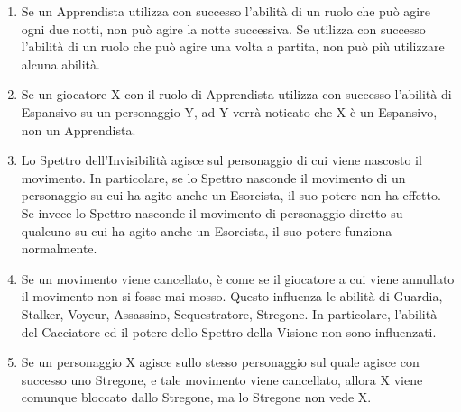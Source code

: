 \documentclass[a4paper,10pt]{article}
\begin{document}
\begin{enumerate}
	\item Se un Apprendista utilizza con successo l'abilità di un ruolo che può agire ogni due notti, non può agire la notte successiva. Se utilizza con successo l'abilità di un ruolo che può agire una volta a partita, non può più utilizzare alcuna abilità.

	\item Se un giocatore X con il ruolo di Apprendista utilizza con successo l'abilità di Espansivo su un personaggio Y, ad Y verrà noticato che X è un Espansivo, non un Apprendista.

	\item Lo Spettro dell'Invisibilità agisce sul personaggio di cui viene nascosto il movimento. In particolare, se lo Spettro nasconde il movimento di un personaggio su cui ha agito anche un Esorcista, il suo potere non ha effetto. Se invece lo Spettro nasconde il movimento di personaggio diretto su qualcuno su cui ha agito anche un Esorcista, il suo potere funziona normalmente.



	\item Se un movimento viene cancellato, è come se il giocatore a cui viene annullato il movimento non si fosse mai mosso. Questo influenza le abilità di Guardia, Stalker, Voyeur, Assassino, Sequestratore, Stregone. In particolare, l'abilità del Cacciatore ed il potere dello Spettro della Visione non sono influenzati.

	\item Se un personaggio X agisce sullo stesso personaggio sul quale agisce con successo uno Stregone, e tale movimento viene cancellato, allora X viene comunque bloccato dallo Stregone, ma lo Stregone non vede X.


\end{enumerate}
\end{document}
